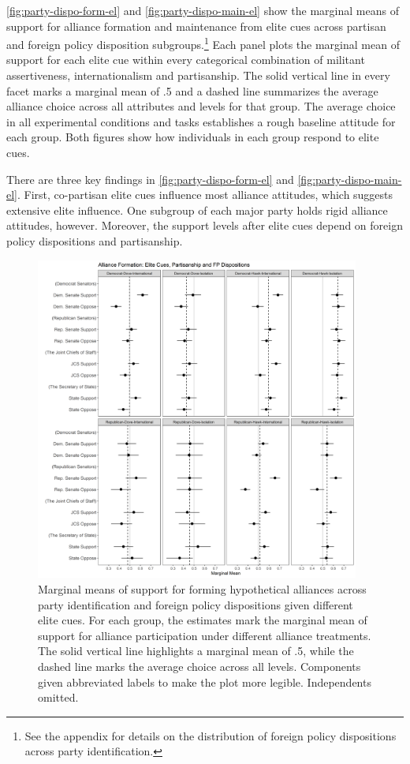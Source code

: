 \documentclass[12pt]{article}
\begin{document}
\autoref{fig:party-dispo-form-el} and \autoref{fig:party-dispo-main-el} show the marginal means of support for alliance formation and maintenance from elite cues across partisan and foreign policy disposition subgroups.\footnote{See the appendix for details on the distribution of foreign policy dispositions across party identification.} 
Each panel plots the marginal mean of support for each elite cue within every categorical combination of militant assertiveness, internationalism and partisanship.
The solid vertical line in every facet marks a marginal mean of .5 and a dashed line summarizes the average alliance choice across all attributes and levels for that group.
The average choice in all experimental conditions and tasks establishes a rough baseline attitude for each group.  
Both figures show how individuals in each group respond to elite cues. 


There are three key findings in \autoref{fig:party-dispo-form-el} and \autoref{fig:party-dispo-main-el}. 
First, co-partisan elite cues influence most alliance attitudes, which suggests extensive elite influence. 
One subgroup of each major party holds rigid alliance attitudes, however. 
Moreover, the support levels after elite cues depend on foreign policy dispositions and partisanship. 



\begin{figure}[htpb]
	\centering
		\includegraphics[width=0.95\textwidth]{../figures/party-dispo-form-el.png}
	\caption{Marginal means of support for forming hypothetical alliances across party identification and foreign policy dispositions given different elite cues. For each group, the estimates mark the marginal mean of support for alliance participation under different alliance treatments. The solid vertical line highlights a marginal mean of .5, while the dashed line marks the average choice across all levels. Components given abbreviated labels to make the plot more legible. Independents omitted.}
	\label{fig:party-dispo-form-el}
\end{figure}
\end{document}
